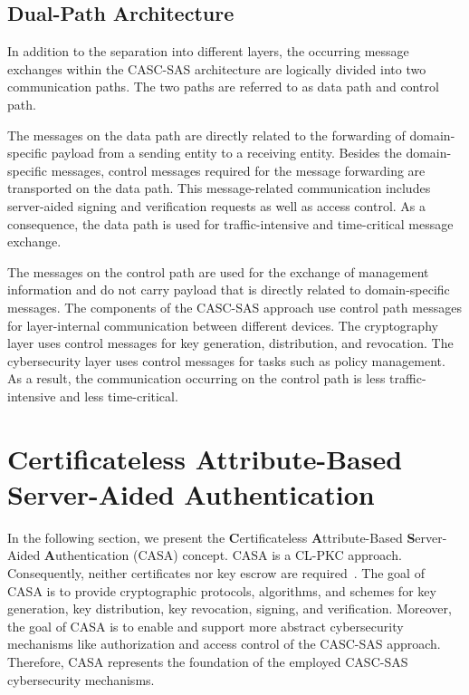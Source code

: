 \subsection{Dual-Path Architecture}
\label{sec:approach:casc:architecture:paths}
In addition to the separation into different layers, the occurring message exchanges within the CASC-SAS architecture are logically divided into two communication paths.
The two paths are referred to as data path and control path.

The messages on the data path are directly related to the forwarding of domain-specific payload from a sending entity to a receiving entity.
Besides the domain-specific messages, control messages required for the message forwarding are transported on the data path.
This message-related communication includes server-aided signing and verification requests as well as access control.
As a consequence, the data path is used for traffic-intensive and time-critical message exchange.

The messages on the control path are used for the exchange of management information and do not carry payload that is directly related to domain-specific messages.
The components of the CASC-SAS approach use control path messages for layer-internal communication between different devices.
The cryptography layer uses control messages for key generation, distribution, and revocation.
The cybersecurity layer uses control messages for tasks such as policy management.
As a result, the communication occurring on the control path is less traffic-intensive and less time-critical.

\section{Certificateless Attribute-Based Server-Aided Authentication}
\label{sec:approach:casa}
In the following section, we present the \textbf{C}ertificateless \textbf{A}ttribute-Based \textbf{S}erver-Aided \textbf{A}uthentication (CASA) concept.
CASA is a CL-PKC approach.
Consequently, neither certificates nor key escrow are required~\cite{AlRiyami2003}.
The goal of CASA is to provide cryptographic protocols, algorithms, and schemes for key generation, key distribution, key revocation, signing, and verification.
Moreover, the goal of CASA is to enable and support more abstract cybersecurity mechanisms like authorization and access control of the CASC-SAS approach.
Therefore, CASA represents the foundation of the employed CASC-SAS cybersecurity mechanisms.


